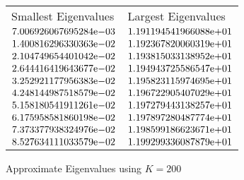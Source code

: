 \begin{enumerate}
\begin{figure}[tbh]
 \centering    
\begin{tabular}{ ||p{6cm}||p{6cm}|}
\hline
 Smallest Eigenvalues & Largest Eigenvalues \\ \hhline{|=|=|}   
\hline
${7.006926067695284}\mathrm{e}{-03}$ & ${1.191194541966088}\mathrm{e}{+01}$ \\  
${1.400816296330363}\mathrm{e}{-02}$ & ${1.192367820060319}\mathrm{e}{+01}$ \\  
${2.104749654401042}\mathrm{e}{-02}$ & ${1.193815033138952}\mathrm{e}{+01}$ \\  
${2.644416419643677}\mathrm{e}{-02}$ & ${1.194943725586547}\mathrm{e}{+01}$ \\  
${3.252921177956383}\mathrm{e}{-02}$ & ${1.195823115974695}\mathrm{e}{+01}$ \\  
${4.248144987518579}\mathrm{e}{-02}$ & ${1.196722905407029}\mathrm{e}{+01}$ \\  
${5.158180541911261}\mathrm{e}{-02}$ & ${1.197279443138257}\mathrm{e}{+01}$ \\  
${6.175958581860198}\mathrm{e}{-02}$ & ${1.197897280487774}\mathrm{e}{+01}$ \\  
${7.373377938324976}\mathrm{e}{-02}$ & ${1.198599186623671}\mathrm{e}{+01}$ \\  
${8.527634111033579}\mathrm{e}{-02}$ & ${1.199299336087879}\mathrm{e}{+01}$ \\  
\hline  
\end{tabular} 
\caption{Approximate Eigenvalues using $K = 200$}
   \label{tab:app_eig_200}
\end{figure} 


\end{enumerate}
